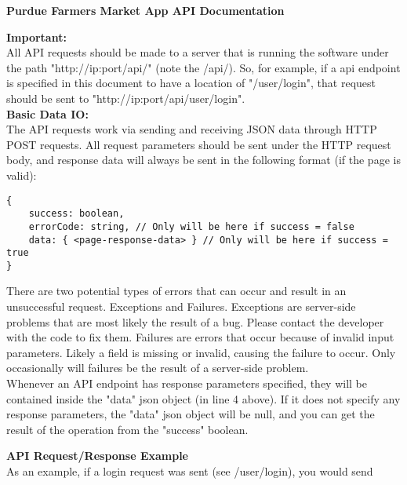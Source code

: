 \documentclass{article}[11pt]
\begin{document}
\vspace{.1in}

\centerline{\textbf{Purdue Farmers Market App API Documentation}} \bigskip

\textbf{Important: } \\ All API requests should be made to a server that is running the software under the path "http://ip:port/api/" (note the /api/). So, for example, if a api endpoint is specified in this document to have a location of "/user/login", that request should be sent to "http://ip:port/api/user/login". \\

\textbf{Basic Data IO:} \\
The API requests work via sending and receiving JSON data through HTTP POST requests. All request parameters should be sent under the HTTP request body, and response data will always be sent in the following format (if the page is valid):

\begin{verbatim}
{     
    success: boolean,
    errorCode: string, // Only will be here if success = false
    data: { <page-response-data> } // Only will be here if success = true
}
\end{verbatim}

There are two potential types of errors that can occur and result in an unsuccessful request. Exceptions and Failures. Exceptions are server-side problems that are most likely the result of a bug. Please contact the developer with the code to fix them. Failures are errors that occur because of invalid input parameters. Likely a field is missing or invalid, causing the failure to occur. Only occasionally will failures be the result of a server-side problem. \\

Whenever an API endpoint has response parameters specified, they will be contained inside the "data" json object (in line 4 above). If it does not specify any response parameters, the "data" json object will be null, and you can get the result of the operation from the "success" boolean. \\

\newpage

\textbf{API Request/Response Example} \\

As an example, if a login request was sent (see /user/login), you would send
\end{document}
